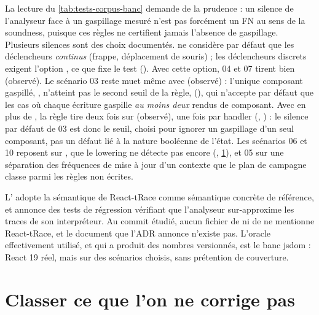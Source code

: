La lecture du \cref{tab:tests-corpus-banc} demande de la prudence : un silence de l'analyseur face à un gaspillage mesuré n'est pas forcément un FN au sens de la soundness, puisque ces règles ne certifient jamais l'absence de gaspillage. Plusieurs silences sont des choix documentés.  ne considère par défaut que les déclencheurs \emph{continus} (frappe, déplacement de souris) ; les déclencheurs discrets exigent l'option , ce que fixe le test  (). Avec cette option, 04 et 07 tirent bien  (observé). Le scénario 03 reste muet même avec  (observé) : l'unique composant gaspillé, , n'atteint pas le second seuil de la règle,  (), qui n'accepte par défaut que les cas où chaque écriture gaspille \emph{au moins deux} rendus de composant. Avec  en plus de , la règle tire deux fois sur  (observé), une fois par handler (, ) : le silence par défaut de 03 est donc le seuil, choisi pour ignorer un gaspillage d'un seul composant, pas un défaut lié à la nature booléenne de l'état. Les scénarios 06 et 10 reposent sur , que le lowering ne détecte pas encore (, \cref{sec:tests-corpus-classer}), et 05 sur une séparation des fréquences de mise à jour d'un contexte que le plan de campagne classe parmi les règles non écrites.

\begin{decision}
L' adopte la sémantique de React-tRace \cite{LeeAhnYi2025} comme sémantique concrète de référence, et annonce des tests de régression vérifiant que l'analyseur sur-approxime les traces de son interpréteur. Au commit étudié, aucun fichier de  ni de  ne mentionne React-tRace, et le document  que l'ADR annonce n'existe pas. L'oracle effectivement utilisé, et qui a produit des nombres versionnés, est le banc jsdom : React 19 réel, mais sur des scénarios choisis, sans prétention de couverture.
\end{decision}

\section{Classer ce que l'on ne corrige pas}
\label{sec:tests-corpus-classer}

